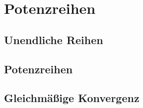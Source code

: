 \section{Potenzreihen}

\subsection{Unendliche Reihen}

\subsection{Potenzreihen}

\subsection{Gleichmäßige Konvergenz}

